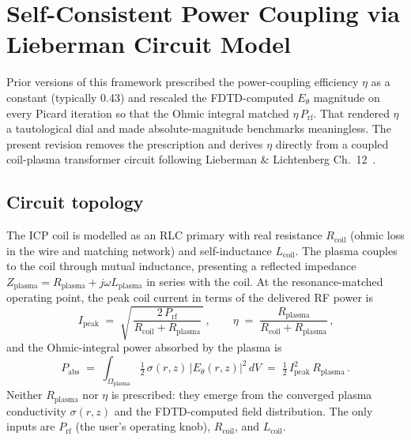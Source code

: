 \section{Self-Consistent Power Coupling via Lieberman Circuit Model}
\label{sec:selfconsistent-eta}

Prior versions of this framework prescribed the power-coupling efficiency
$\eta$ as a constant (typically 0.43) and rescaled the FDTD-computed
$E_\theta$ magnitude on every Picard iteration so that the Ohmic integral
matched $\eta \, P_\mathrm{rf}$.  That rendered $\eta$ a tautological dial
and made absolute-magnitude benchmarks meaningless.  The present revision
removes the prescription and derives $\eta$ directly from a coupled
coil-plasma transformer circuit following Lieberman \& Lichtenberg
Ch.~12~\cite{Lieberman2005}.

\subsection*{Circuit topology}

The ICP coil is modelled as an RLC primary with real resistance
$R_\mathrm{coil}$ (ohmic loss in the wire and matching network) and
self-inductance $L_\mathrm{coil}$.  The plasma couples to the coil
through mutual inductance, presenting a reflected impedance
$Z_\mathrm{plasma} = R_\mathrm{plasma} + j \omega L_\mathrm{plasma}$ in
series with the coil.  At the resonance-matched operating point, the
peak coil current in terms of the delivered RF power is
\begin{equation}
  \boxed{\,I_\mathrm{peak} \;=\; \sqrt{\,\dfrac{2\,P_\mathrm{rf}}{R_\mathrm{coil} + R_\mathrm{plasma}}\,}\,,\qquad
   \eta \;=\; \dfrac{R_\mathrm{plasma}}{R_\mathrm{coil} + R_\mathrm{plasma}}\,,}
  \label{eq:circuit-closure}
\end{equation}
and the Ohmic-integral power absorbed by the plasma is
\begin{equation}
  P_\mathrm{abs} \;=\; \int_{\Omega_\mathrm{plasma}} \tfrac{1}{2}\,\sigma(r,z)\,|E_\theta(r,z)|^2\, dV \;=\; \tfrac{1}{2}\,I_\mathrm{peak}^2\,R_\mathrm{plasma}\,.
  \label{eq:Ohmic-integral}
\end{equation}
Neither $R_\mathrm{plasma}$ nor $\eta$ is prescribed: they emerge from the
converged plasma conductivity $\sigma(r,z)$ and the FDTD-computed field
distribution.  The only inputs are $P_\mathrm{rf}$ (the user's operating
knob), $R_\mathrm{coil}$, and $L_\mathrm{coil}$.

